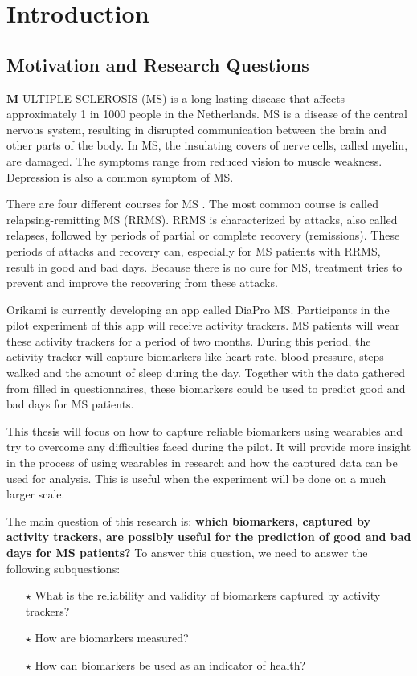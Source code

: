 \chapter{Introduction}\label{introduction}

\section{Motivation and Research Questions}
\lettrine[lhang = 0.4, findent=-60pt, lines=7]{\textbf{
		\initfamily \fontsize{40mm}{40mm} \selectfont M
		\normalfont}}{ULTIPLE SCLEROSIS (MS)}
 is a long lasting disease that affects approximately 1 in 1000 people in the Netherlands.
MS is a disease of the central nervous system, resulting in disrupted communication between the brain and other parts of the body.
In MS, the insulating covers of nerve cells, called myelin, are damaged.  
The symptoms range from reduced vision to muscle weakness. 
Depression is also a common symptom of MS.

There are four different courses for MS \cite{lublin2014defining}.
The most common course is called relapsing-remitting MS (RRMS).
RRMS is characterized by attacks, also called relapses, followed by periods of partial or complete recovery (remissions).
These periods of attacks and recovery can, especially for MS patients with RRMS, result in good and bad days.
Because there is no cure for MS, treatment tries to prevent and improve the recovering from these attacks.

Orikami is currently developing an app called DiaPro MS. 
Participants in the pilot experiment of this app will receive activity trackers. 
MS patients will wear these activity trackers for a period of two months.
During this period, the activity tracker will capture biomarkers like heart rate, blood pressure, steps walked and the amount of sleep during the day.
Together with the data gathered from filled in questionnaires, these biomarkers could be used to predict good and bad days for MS patients.

This thesis will focus on how to capture reliable biomarkers using wearables and try to overcome any difficulties faced during the pilot. 
It will provide more insight in the process of using wearables in research and how the captured data can be used for analysis.
This is useful when the experiment will be done on a much larger scale. 

The main question of this research is: \textbf{which biomarkers, captured by activity trackers, are possibly useful for the prediction of good and bad days for MS patients? }
To answer this question, we need to answer the following subquestions:
%
\begin{itemize}
	\item[$\star$] What is the reliability and validity of biomarkers captured by activity trackers?
	
	\item[$\star$] How are biomarkers measured?
	
	\item[$\star$] How can biomarkers be used as an indicator of health?
\end{itemize}
%

